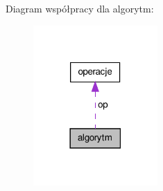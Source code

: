 \-Diagram współpracy dla algorytm\-:\nopagebreak
\begin{figure}[H]
\begin{center}
\leavevmode
\includegraphics[width=134pt]{classalgorytm__coll__graph}
\end{center}
\end{figure}
